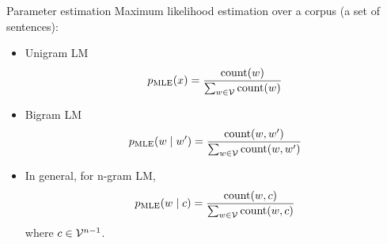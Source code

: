 \documentclass[usenames,dvipsnames,notes,11pt,aspectratio=169,hyperref={colorlinks=true, linkcolor=blue}]{beamer}
\begin{document}

%

\begin{frame}
    {Parameter estimation}
    Maximum likelihood estimation over a corpus (a set of sentences):\\
    \begin{itemize}
        \item Unigram LM
            $$
            {p}_{\text{MLE}}(x) = \frac{\text{count}(w)}{\sum_{w\in\mathcal{V}}\text{count}(w)}
            $$
        \item Bigram LM
            $$
            {p}_{\text{MLE}}(w\mid w') =
            \frac{\text{count}(w,w')}{\sum_{w\in\mathcal{V}}\text{count}(w,w')}
            $$
        \item In general, for n-gram LM,
            $$
            {p}_{\text{MLE}}(w\mid c) =
            \frac{\text{count}(w,c)}{\sum_{w\in\mathcal{V}}\text{count}(w,c)}
            $$
            where $c\in \mathcal{V}^{n-1}$.
    \end{itemize}
\end{frame}
\end{document}
